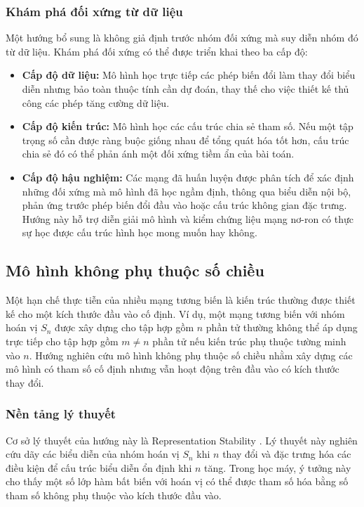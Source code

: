 \subsubsection{Khám phá đối xứng từ dữ liệu}
Một hướng bổ sung là không giả định trước nhóm đối xứng mà suy diễn nhóm đó từ dữ liệu. Khám phá đối xứng có thể được triển khai theo ba cấp độ:
\begin{itemize}
    \item \textbf{Cấp độ dữ liệu:} Mô hình học trực tiếp các phép biến đổi làm thay đổi biểu diễn nhưng bảo toàn thuộc tính cần dự đoán, thay thế cho việc thiết kế thủ công các phép tăng cường dữ liệu.
    \item \textbf{Cấp độ kiến trúc:} Mô hình học các cấu trúc chia sẻ tham số. Nếu một tập trọng số cần được ràng buộc giống nhau để tổng quát hóa tốt hơn, cấu trúc chia sẻ đó có thể phản ánh một đối xứng tiềm ẩn của bài toán.
    \item \textbf{Cấp độ hậu nghiệm:} Các mạng đã huấn luyện được phân tích để xác định những đối xứng mà mô hình đã học ngầm định, thông qua biểu diễn nội bộ, phản ứng trước phép biến đổi đầu vào hoặc cấu trúc không gian đặc trưng. Hướng này hỗ trợ diễn giải mô hình và kiểm chứng liệu mạng nơ-ron có thực sự học được cấu trúc hình học mong muốn hay không.
\end{itemize}

\subsection{Mô hình không phụ thuộc số chiều}
\label{subsec:any-dimensional}

Một hạn chế thực tiễn của nhiều mạng tương biến là kiến trúc thường được thiết kế cho một kích thước đầu vào cố định. Ví dụ, một mạng tương biến với nhóm hoán vị $S_n$ được xây dựng cho tập hợp gồm $n$ phần tử thường không thể áp dụng trực tiếp cho tập hợp gồm $m \neq n$ phần tử nếu kiến trúc phụ thuộc tường minh vào $n$. Hướng nghiên cứu mô hình không phụ thuộc số chiều nhằm xây dựng các mô hình có tham số cố định nhưng vẫn hoạt động trên đầu vào có kích thước thay đổi.

\subsubsection{Nền tảng lý thuyết}

Cơ sở lý thuyết của hướng này là Representation Stability \cite{farb2014representation}. Lý thuyết này nghiên cứu dãy các biểu diễn của nhóm hoán vị $S_n$ khi $n$ thay đổi và đặc trưng hóa các điều kiện để cấu trúc biểu diễn ổn định khi $n$ tăng. Trong học máy, ý tưởng này cho thấy một số lớp hàm bất biến với hoán vị có thể được tham số hóa bằng số tham số không phụ thuộc vào kích thước đầu vào.

